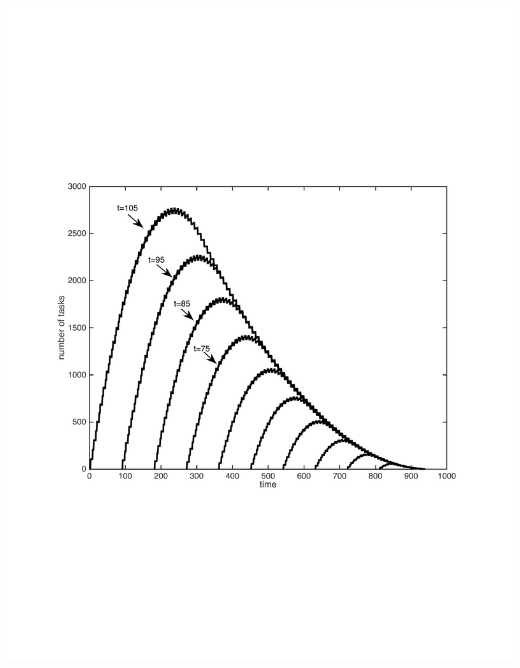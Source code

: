 \begin{frame}

\includegraphics[width=.80\textwidth]{matlab_files/escargots_100_by_10__v2.pdf}\\

\end{frame}

